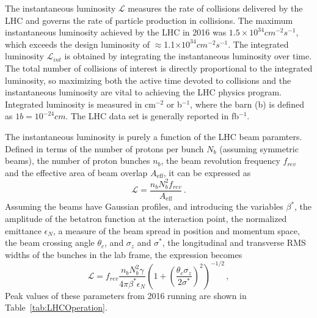 The instantaneous luminosity $\mathcal{L}$
measures the rate of \pp collisions delivered by the LHC
and governs the rate of particle production in collisions.
The maximum instantaneous luminosity achieved by the LHC in 2016 was
$1.5\times 10^{34}\unit{cm}^{-2}s^{-1}$, which exceeds the design 
luminosity of $\approx$1.1$\times 10^{34}\unit{cm}^{-2}s^{-1}$. 
The integrated luminosity $\mathcal{L}_{int}$ 
is obtained by integrating the instantaneous luminosity over time.
The total number of collisions of interest is directly proportional to the 
integrated luminosity, so maximizing both the active time devoted to collisions and
the instantaneous luminosity are vital to achieving the LHC physics program.
Integrated luminosity is measured in cm$^{-2}$ or b$^{-1}$,
where the barn (b) is defined as $1\unit{b} = 10^{-24}\unit{cm}$. 
The LHC data set is generally reported in fb$^{-1}$.

The instantaneous luminosity is purely a function of the LHC beam paramters. 
Defined in terms of the number of 
protons per bunch $N_{b}$ (assuming symmetric beams), the number of proton bunches $n_b$, the 
beam revolution frequency $f_{rev}$ and the effective 
area of beam overlap $A_\text{eff}$, it can be expressed as
\begin{equation}
  \mathcal{L} = \frac{n_b N_b^2 f_\textit{rev}}{A_\text{eff}}\,.
\end{equation}
Assuming the beams have Gaussian profiles, and introducing the variables
$\beta^\ast$, the amplitude of the betatron function 
at the interaction point, the normalized emittance $\epsilon_N$,
a measure of the beam spread in position and momentum space, 
the beam crossing angle $\theta_c$, and $\sigma_z$ and 
$\sigma^\ast$, the longitudinal and transverse RMS widths of 
the bunches in the lab frame, the expression becomes
\begin{equation}
  \mathcal{L} = f_\textit{rev} \frac{n_b N_b^2 \gamma}{4\pi \beta^\ast \epsilon_N}\left(1 + \left(\frac{\theta_c \sigma_z}{2\sigma^\ast}\right)^2\right)^{-1/2}\,,
  \label{eq:lumi}
\end{equation}
Peak values of these parameters from 2016 running are shown in Table~\ref{tab:LHCOperation}.

